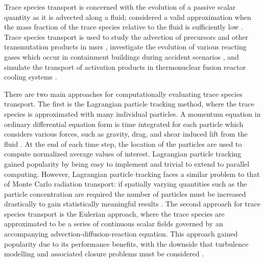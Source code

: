 Trace species transport is concerned with the evolution of a passive scalar quantity as it is advected along a fluid; considered a valid approximation when the mass fraction of the trace species relative to the fluid is sufficiently low \cite{turbulent_species_transport}. Trace species transport is used to study the advection of precursors and other transmutation products in \acrshort{msr}s \cite{moltres,moose_ns_crab}, investigate the evolution of various reacting gases which occur in containment buildings during accident scenarios \cite{containment_foam}, and simulate the transport of activation products in thermonuclear fusion reactor cooling systems \cite{fusion_activation_wall,fusion_activation_tool_fluned,fusion_activation_demo_wcll,fusion_activation_modelling}.

There are two main approaches for computationally evaluating trace species transport. The first is the Lagrangian particle tracking method, where the trace species is approximated with many individual particles. A momentum equation in ordinary differential equation form is time integrated for each particle which considers various forces, such as gravity, drag, and shear induced lift from the fluid \cite{turbulent_species_transport}. At the end of each time step, the location of the particles are used to compute normalized average values of interest. Lagrangian particle tracking gained popularity by being easy to implement and trivial to extend to parallel computing. However, Lagrangian particle tracking faces a similar problem to that of Monte Carlo radiation transport: if spatially varying quantities such as the particle concentration are required the number of particles must be increased drastically to gain statistically meaningful results \cite{turbulent_species_transport}. The second approach for trace species transport is the Eulerian approach, where the trace species are approximated to be a series of continuous scalar fields governed by an accompanying advection-diffusion-reaction equation. This approach gained popularity due to its performance benefits, with the downside that turbulence modelling and associated closure problems must be considered \cite{turbulent_species_transport}.

